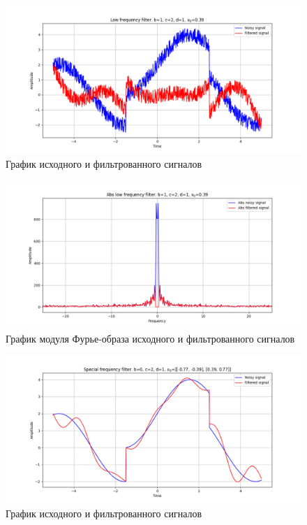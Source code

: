 \documentclass[a4paper, 12pt]{article}
\begin{document}
    \begin{figure}[!htb]
        \centering
        \includegraphics[scale=0.485]{1_2_u_flt_u_nospec.png}
        \captionsetup{skip=0pt}
        \caption{График исходного и фильтрованного сигналов}
        \label{fig:fig75}
    \end{figure}
    \begin{figure}[!htb]
        \centering
        \includegraphics[scale=0.485]{1_2_abs_u_U_nospec.png}
        \captionsetup{skip=0pt}
        \caption{График модуля Фурье-образа исходного и фильтрованного сигналов}
        \label{fig:fig76}
    \end{figure}
    \begin{figure}[!htb]
        \centering
        \includegraphics[scale=0.485]{2_u_flt_u_nospec.png}
        \captionsetup{skip=0pt}
        \caption{График исходного и фильтрованного сигналов}
        \label{fig:fig77}
    \end{figure}
\end{document}
